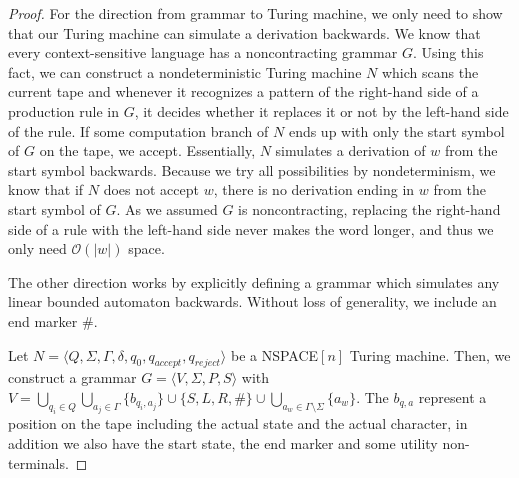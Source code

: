 \begin{proof}
    For the direction from grammar to Turing machine, we only need to show that our Turing machine can simulate a derivation backwards.
    We know that every context-sensitive language has a noncontracting grammar $G$.
    Using this fact, we can construct a nondeterministic Turing machine $N$ which scans the current tape and whenever it recognizes a pattern of the right-hand side of a production rule in $G$, it decides whether it replaces it or not by the left-hand side of the rule.
    If some computation branch of $N$ ends up with only the start symbol of $G$ on the tape, we accept.
    Essentially, $N$ simulates a derivation of $w$ from the start symbol backwards.
    Because we try all possibilities by nondeterminism, we know that if $N$ does not accept $w$, there is no derivation ending in $w$ from the start symbol of $G$.
    As we assumed $G$ is noncontracting, replacing the right-hand side of a rule with the left-hand side never makes the word longer, and thus we only need $\mathcal{O}(|w|)$ space.

    \vspace{5mm}

    The other direction works by explicitly defining a grammar which simulates any linear bounded automaton backwards.
    Without loss of generality, we include an end marker $\#$.

    Let $N = \langle Q, \Sigma, \Gamma, \delta, q_0, q_{accept}, q_{reject} \rangle$ be a \acs{NSPACE}$[n]$ Turing machine.
    Then, we construct a grammar $G = \langle V, \Sigma, P, S \rangle$ with $V = \bigcup_{q_i \in Q} \bigcup_{a_j \in \Gamma} \{b_{q_i, a_j}\} \cup \{S, L, R, \#\} \cup \bigcup_{a_w \in \Gamma \setminus \Sigma} \{a_w\}$.
    The $b_{q, a}$ represent a position on the tape including the actual state and the actual character, in addition we also have the start state, the end marker and some utility non-terminals.


\end{proof}
